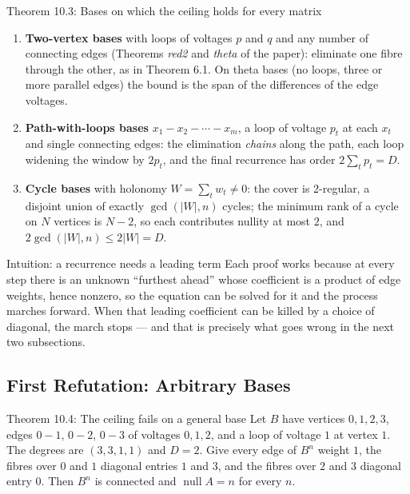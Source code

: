 \documentclass[11pt]{article}
\begin{document}
\begin{thmbox}{Theorem 10.3: Bases on which the ceiling holds for every matrix}
\begin{enumerate}[leftmargin=*,nosep]
  \item \textbf{Two-vertex bases} with loops of voltages $p$ and $q$ and any number of connecting edges (Theorems \emph{red2} and \emph{theta} of the paper): eliminate one fibre through the other, as in Theorem 6.1. On theta bases (no loops, three or more parallel edges) the bound is the span of the differences of the edge voltages.
  \item \textbf{Path-with-loops bases} $x_1\!-\!x_2\!-\!\cdots\!-\!x_m$, a loop of voltage $p_t$ at each $x_t$ and single connecting edges: the elimination \emph{chains} along the path, each loop widening the window by $2p_t$, and the final recurrence has order $2\sum_tp_t=D$.
  \item \textbf{Cycle bases} with holonomy $W=\sum_tw_t\ne0$: the cover is $2$-regular, a disjoint union of exactly $\gcd(|W|,n)$ cycles; the minimum rank of a cycle on $N$ vertices is $N-2$, so each contributes nullity at most $2$, and $2\gcd(|W|,n)\le2|W|=D$.
\end{enumerate}
\end{thmbox}

\begin{intubox}{Intuition: a recurrence needs a leading term}
Each proof works because at every step there is an unknown ``furthest ahead'' whose coefficient is a product of edge weights, hence nonzero, so the equation can be solved for it and the process marches forward. When that leading coefficient can be killed by a choice of diagonal, the march stops --- and that is precisely what goes wrong in the next two subsections.
\end{intubox}

\subsection{First Refutation: Arbitrary Bases}

\begin{thmbox}{Theorem 10.4: The ceiling fails on a general base}
Let $B$ have vertices $0,1,2,3$, edges $0\!-\!1$, $0\!-\!2$, $0\!-\!3$ of voltages $0,1,2$, and a loop of voltage $1$ at vertex $1$. The degrees are $(3,3,1,1)$ and $D=2$. Give every edge of $B^n$ weight $1$, the fibres over $0$ and $1$ diagonal entries $1$ and $3$, and the fibres over $2$ and $3$ diagonal entry $0$. Then $B^n$ is connected and $\operatorname{null}A=n$ for every $n$.
\end{thmbox}
\end{document}
